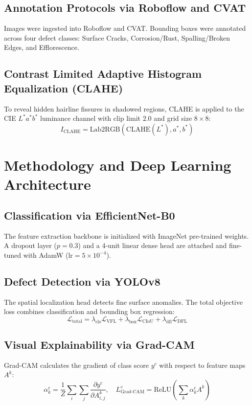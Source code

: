 \documentclass[12pt,a4paper]{report}
\theoremstyle{definition}
\begin{document}
\section{Annotation Protocols via Roboflow and CVAT}
Images were ingested into Roboflow and CVAT. Bounding boxes were annotated across four defect classes: Surface Cracks, Corrosion/Rust, Spalling/Broken Edges, and Efflorescence.

\section{Contrast Limited Adaptive Histogram Equalization (CLAHE)}
To reveal hidden hairline fissures in shadowed regions, CLAHE is applied to the CIE $L^*a^*b^*$ luminance channel with clip limit $2.0$ and grid size $8 \times 8$:
\begin{equation}
I_{\text{CLAHE}} = \text{Lab2RGB}\left(\text{CLAHE}(L^*), a^*, b^*\right)
\end{equation}

\chapter{Methodology and Deep Learning Architecture}
\section{Classification via EfficientNet-B0}
The feature extraction backbone is initialized with ImageNet pre-trained weights. A dropout layer ($p=0.3$) and a 4-unit linear dense head are attached and fine-tuned with AdamW ($\text{lr} = 5 \times 10^{-4}$).

\section{Defect Detection via YOLOv8}
The spatial localization head detects fine surface anomalies. The total objective loss combines classification and bounding box regression:
\begin{equation}
\mathcal{L}_{\text{total}} = \lambda_{\text{cls}} \mathcal{L}_{\text{VFL}} + \lambda_{\text{box}} \mathcal{L}_{\text{CIoU}} + \lambda_{\text{dfl}} \mathcal{L}_{\text{DFL}}
\end{equation}

\section{Visual Explainability via Grad-CAM}
Grad-CAM calculates the gradient of class score $y^c$ with respect to feature maps $A^k$:
\begin{equation}
\alpha_k^c = \frac{1}{Z} \sum_{i} \sum_{j} \frac{\partial y^c}{\partial A_{i,j}^k}, \quad L_{\text{Grad-CAM}}^c = \text{ReLU}\left(\sum_k \alpha_k^c A^k\right)
\end{equation}
\end{document}
